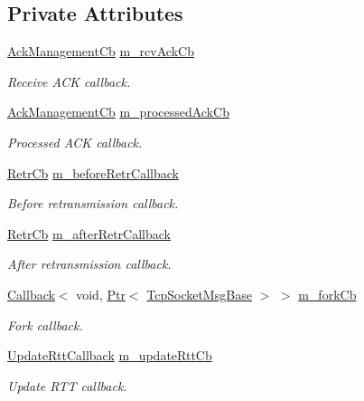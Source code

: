 \subsection*{Private Attributes}
\begin{DoxyCompactItemize}
\item 
\hyperlink{classns3_1_1TcpSocketMsgBase_a266be95f5377eb857b8b6fa75fa92784}{Ack\+Management\+Cb} \hyperlink{classns3_1_1TcpSocketMsgBase_a524f3cb4bf9a9e5c8a57ce132496ac21}{m\+\_\+rcv\+Ack\+Cb}
\begin{DoxyCompactList}\small\item\em Receive A\+CK callback. \end{DoxyCompactList}\item 
\hyperlink{classns3_1_1TcpSocketMsgBase_a266be95f5377eb857b8b6fa75fa92784}{Ack\+Management\+Cb} \hyperlink{classns3_1_1TcpSocketMsgBase_a13e9a6635995e3cb4af2afc90b0dfa57}{m\+\_\+processed\+Ack\+Cb}
\begin{DoxyCompactList}\small\item\em Processed A\+CK callback. \end{DoxyCompactList}\item 
\hyperlink{classns3_1_1TcpSocketMsgBase_a2b86195d79093ed98a9dfb7ccf635e67}{Retr\+Cb} \hyperlink{classns3_1_1TcpSocketMsgBase_acc2c27503c22015f393ee2c36ff59a44}{m\+\_\+before\+Retr\+Callback}
\begin{DoxyCompactList}\small\item\em Before retransmission callback. \end{DoxyCompactList}\item 
\hyperlink{classns3_1_1TcpSocketMsgBase_a2b86195d79093ed98a9dfb7ccf635e67}{Retr\+Cb} \hyperlink{classns3_1_1TcpSocketMsgBase_af6ff519127abb80a47eedb483466a603}{m\+\_\+after\+Retr\+Callback}
\begin{DoxyCompactList}\small\item\em After retransmission callback. \end{DoxyCompactList}\item 
\hyperlink{classns3_1_1Callback}{Callback}$<$ void, \hyperlink{classns3_1_1Ptr}{Ptr}$<$ \hyperlink{classns3_1_1TcpSocketMsgBase}{Tcp\+Socket\+Msg\+Base} $>$ $>$ \hyperlink{classns3_1_1TcpSocketMsgBase_ad3f13eb14ba453a59500b6275fa3539e}{m\+\_\+fork\+Cb}
\begin{DoxyCompactList}\small\item\em Fork callback. \end{DoxyCompactList}\item 
\hyperlink{classns3_1_1TcpSocketMsgBase_ab7f20ba80824e33974a46f48dd3de7b7}{Update\+Rtt\+Callback} \hyperlink{classns3_1_1TcpSocketMsgBase_a05049cc032290301a3dd9d654d79a006}{m\+\_\+update\+Rtt\+Cb}
\begin{DoxyCompactList}\small\item\em Update R\+TT callback. \end{DoxyCompactList}\end{DoxyCompactItemize}
